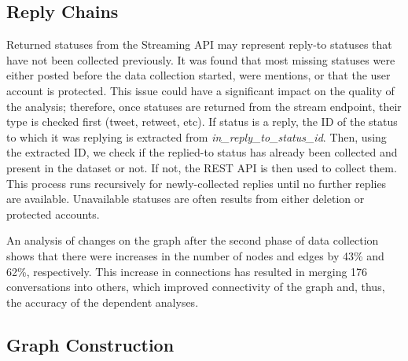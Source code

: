 \documentclass[sigconf]{acmart}
\begin{document}
\subsection{Reply Chains}

Returned statuses from the Streaming API may represent reply-to
statuses that have not been collected previously. It was found that
most missing statuses were either posted before the data collection
started, were mentions, or that the user account is protected. This
issue could have a significant impact on the quality of the analysis;
therefore, once statuses are returned from the stream endpoint, their
type is checked first (tweet, retweet, etc). If status is a reply, the
ID of the status to which it was replying is extracted from
{\emph{in\_reply\_to\_status\_id}}. Then, using the extracted ID, we
check if the replied-to status has already been collected and present
in the dataset or not. If not, the REST API is then used to collect
them. This process runs recursively for newly-collected replies until
no further replies are available. Unavailable statuses are often
results from either deletion or protected accounts.

An analysis of changes on the graph after the second phase of data
collection shows that there were increases in the number of nodes and
edges by 43\% and 62\%, respectively. This increase in connections has
resulted in merging 176 conversations into others, which improved
connectivity of the graph and, thus, the accuracy of the dependent
analyses.



\subsection{Graph Construction}
\end{document}
